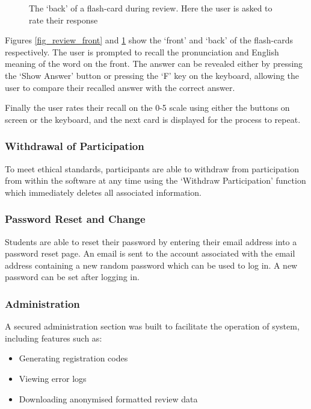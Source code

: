 \begin{figure}
\caption{The `back' of a flash-card during review. Here the user is asked to rate
their response}
\label{fig_review_back}
\end{figure}

Figures \ref{fig_review_front} and \ref{fig_review_back} show the `front' and `back' of the
flash-cards respectively. The user is prompted to recall the pronunciation and English
meaning of the word on the front. The answer can be revealed either by pressing
the `Show Answer' button or pressing the `F' key on the keyboard, allowing the user to compare
their recalled answer with the correct answer.

Finally the user rates their recall on the 0-5 scale using either the buttons on screen or
the keyboard, and the next card is displayed for the process to repeat.

\subsubsection{Withdrawal of Participation}
To meet ethical standards, participants are able to withdraw
from participation from within the software at any time
using the `Withdraw Participation' function which immediately deletes all associated
information.

\subsubsection{Password Reset and Change}
Students are able to reset their password by entering their email address into a
password reset page. An email is sent to the account associated with
the email address containing a new random password which
can be used to log in. A new password can be set after logging in.
 

\subsubsection{Administration}
A secured administration section was built to facilitate the operation of system, including
features such as:
\begin{itemize}
  \item Generating registration codes
  \item Viewing error logs
  \item Downloading anonymised formatted review data
\end{itemize} 

